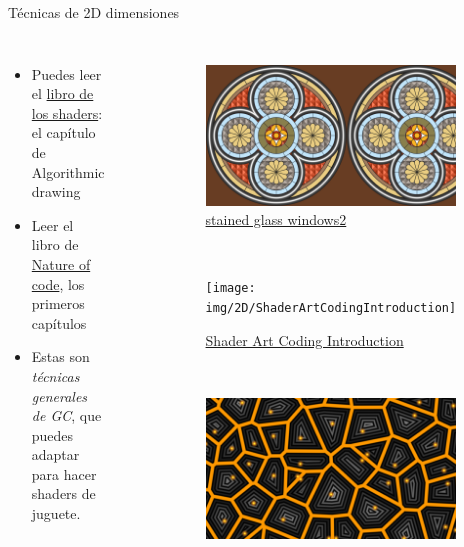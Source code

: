 \begin{frame}{Técnicas de 2D dimensiones}
\begin{columns}
    \begin{itemize}
         \item Puedes leer el \href{https://thebookofshaders.com/05/}{libro de los shaders}: el capítulo de Algorithmic drawing
         \item Leer el libro de \href{https://natureofcode.com/}{Nature of code}, los primeros capítulos
         \item Estas son \emph{técnicas generales de GC}, que puedes adaptar para hacer shaders de juguete.
     \end{itemize}
\begin{figure}[htp]
 \centering
 \begin{subfigure}[b]{0.42\textwidth}
   \includegraphics[width=\textwidth]{img/2D/stainedGlassWindows2}
   \caption{\href{https://www.shadertoy.com/view/3cXSz4}{stained glass windows2}}
 \end{subfigure}
~
 \begin{subfigure}[b]{0.42\textwidth}
   \texttt{[image: img/2D/ShaderArtCodingIntroduction]}
   \caption{\href{https://www.shadertoy.com/view/mtyGWy}{Shader Art Coding Introduction}}
 \end{subfigure}
\\
 \begin{subfigure}[b]{0.42\textwidth}
   \includegraphics[width=\textwidth]{img/2D/VoronoiDistances}

\end{subfigure}
\end{figure}
\end{columns}
\end{frame}
